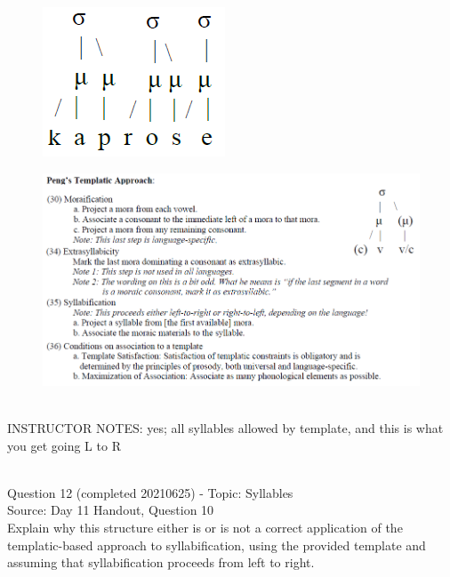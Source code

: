 \documentclass[12pt]{article}
\begin{document}
\begin{figure}[H]
\includegraphics{../images/pengtemplate_kaprosse_yes.png}
\end{figure}
\begin{figure}[H]
\includegraphics{../images/peng_template_withdiagram.png}
\end{figure}

~\\
INSTRUCTOR NOTES: yes; all syllables allowed by template, and this is what you get going L to R


~\\

{\large Question 12} (completed 20210625) - Topic: Syllables\\
Source: Day 11 Handout, Question 10\\

Explain why this structure either is or is not a correct application of the templatic-based approach to syllabification, using the provided template and assuming that syllabification proceeds from left to right.\\
\end{document}
